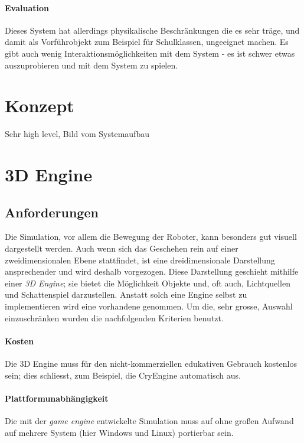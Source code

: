 \documentclass[
    12pt,
    bibliography=totoc,
    ngerman
]{scrartcl}
\begin{document}

\paragraph{Evaluation} Dieses System hat allerdings physikalische Beschr{\"{a}}nkungen die es sehr
tr{\"{a}}ge, und damit als Vorf{\"{u}}hrobjekt zum Beispiel f{\"{u}}r Schulklassen,
ungeeignet machen. Es gibt auch wenig Interaktionsm{\"{o}}glichkeiten mit dem System - es ist schwer etwas auszuprobieren und
mit dem System zu spielen.

\clearpage
\section{Konzept}
Sehr high level, Bild vom Systemaufbau

\clearpage
\section{3D Engine}
\subsection{Anforderungen}
Die Simulation, vor allem die Bewegung der Roboter, kann besonders gut visuell dargestellt werden. Auch wenn sich das Geschehen rein auf einer zweidimensionalen Ebene stattfindet, ist eine dreidimensionale
Darstellung ansprechender und wird deshalb vorgezogen. Diese Darstellung geschieht mithilfe einer \textit{3D Engine}; sie bietet die M{\"{o}}glichkeit Objekte und, oft auch, Lichtquellen und Schattenspiel darzustellen.
Anstatt solch eine Engine selbst zu implementieren wird eine vorhandene genommen. Um die, sehr grosse, Auswahl einzuschr{\"{a}}nken wurden die nachfolgenden Kriterien benutzt.

\paragraph{Kosten} Die 3D Engine muss f{\"{u}}r den nicht-kommerziellen edukativen Gebrauch kostenlos sein; dies schliesst, zum Beispiel, die CryEngine\cite{cryengine} automatisch aus.

\paragraph{Plattformunabh{\"{a}}ngigkeit} Die mit der \textit{game engine} entwickelte Simulation muss auf ohne gro{\ss}en Aufwand auf mehrere System (hier Windows und Linux) portierbar sein.
\end{document}
